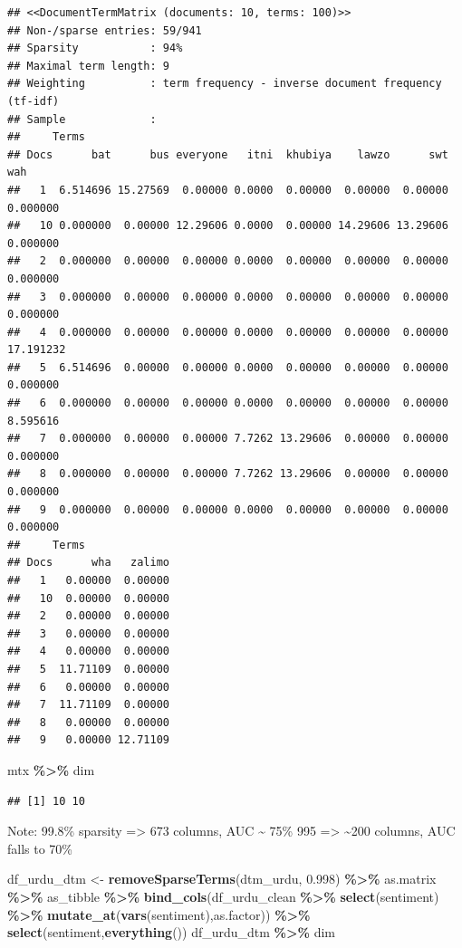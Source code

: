 \documentclass[
]{article}
\newenvironment{Shaded}{\begin{snugshade}}{\end{snugshade}}
\newcommand{\FloatTok}[1]{\textcolor[rgb]{0.00,0.00,0.81}{#1}}
\newcommand{\KeywordTok}[1]{\textcolor[rgb]{0.13,0.29,0.53}{\textbf{#1}}}
\newcommand{\NormalTok}[1]{#1}
\newcommand{\OperatorTok}[1]{\textcolor[rgb]{0.81,0.36,0.00}{\textbf{#1}}}
\newcommand{\StringTok}[1]{\textcolor[rgb]{0.31,0.60,0.02}{#1}}
\begin{document}
\begin{verbatim}
## <<DocumentTermMatrix (documents: 10, terms: 100)>>
## Non-/sparse entries: 59/941
## Sparsity           : 94%
## Maximal term length: 9
## Weighting          : term frequency - inverse document frequency (tf-idf)
## Sample             :
##     Terms
## Docs      bat      bus everyone   itni  khubiya    lawzo      swt       wah
##   1  6.514696 15.27569  0.00000 0.0000  0.00000  0.00000  0.00000  0.000000
##   10 0.000000  0.00000 12.29606 0.0000  0.00000 14.29606 13.29606  0.000000
##   2  0.000000  0.00000  0.00000 0.0000  0.00000  0.00000  0.00000  0.000000
##   3  0.000000  0.00000  0.00000 0.0000  0.00000  0.00000  0.00000  0.000000
##   4  0.000000  0.00000  0.00000 0.0000  0.00000  0.00000  0.00000 17.191232
##   5  6.514696  0.00000  0.00000 0.0000  0.00000  0.00000  0.00000  0.000000
##   6  0.000000  0.00000  0.00000 0.0000  0.00000  0.00000  0.00000  8.595616
##   7  0.000000  0.00000  0.00000 7.7262 13.29606  0.00000  0.00000  0.000000
##   8  0.000000  0.00000  0.00000 7.7262 13.29606  0.00000  0.00000  0.000000
##   9  0.000000  0.00000  0.00000 0.0000  0.00000  0.00000  0.00000  0.000000
##     Terms
## Docs      wha   zalimo
##   1   0.00000  0.00000
##   10  0.00000  0.00000
##   2   0.00000  0.00000
##   3   0.00000  0.00000
##   4   0.00000  0.00000
##   5  11.71109  0.00000
##   6   0.00000  0.00000
##   7  11.71109  0.00000
##   8   0.00000  0.00000
##   9   0.00000 12.71109
\end{verbatim}

\begin{Shaded}
\begin{Highlighting}[]
\NormalTok{mtx }\OperatorTok{\%\textgreater{}\%}\StringTok{ }\NormalTok{dim}
\end{Highlighting}
\end{Shaded}

\begin{verbatim}
## [1] 10 10
\end{verbatim}

Note: 99.8\% sparsity =\textgreater{} 673 columns, AUC \textasciitilde{}
75\% 995 =\textgreater{} \textasciitilde200 columns, AUC falls to 70\%

\begin{Shaded}
\begin{Highlighting}[]
\NormalTok{df\_urdu\_dtm \textless{}{-}}\StringTok{ }\KeywordTok{removeSparseTerms}\NormalTok{(dtm\_urdu, }\FloatTok{0.998}\NormalTok{) }\OperatorTok{\%\textgreater{}\%}
\StringTok{  }\NormalTok{as.matrix }\OperatorTok{\%\textgreater{}\%}\StringTok{  }\NormalTok{as\_tibble }\OperatorTok{\%\textgreater{}\%}
\StringTok{  }\KeywordTok{bind\_cols}\NormalTok{(df\_urdu\_clean }\OperatorTok{\%\textgreater{}\%}\StringTok{ }\KeywordTok{select}\NormalTok{(sentiment) }\OperatorTok{\%\textgreater{}\%}
\StringTok{              }\KeywordTok{mutate\_at}\NormalTok{(}\KeywordTok{vars}\NormalTok{(sentiment),as.factor)) }\OperatorTok{\%\textgreater{}\%}
\StringTok{  }\KeywordTok{select}\NormalTok{(sentiment,}\KeywordTok{everything}\NormalTok{())}
\NormalTok{df\_urdu\_dtm }\OperatorTok{\%\textgreater{}\%}\StringTok{ }\NormalTok{dim}
\end{Highlighting}
\end{Shaded}
\end{document}
